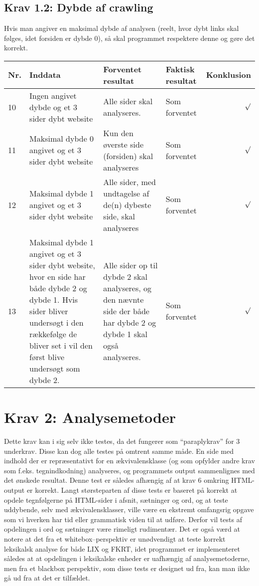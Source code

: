 \documentclass[a4paper,oneside,article]{memoir}
\begin{document}
\begin{landscape}
\subsection{Krav 1.2: Dybde af crawling}
Hvis man angiver en maksimal dybde af analysen (reelt, hvor dybt links
skal følges, idet forsiden er dybde 0), så skal programmet respektere
denne og gøre det korrekt.

\begin{longtable}[c]{p{20pt}|p{220pt}|p{130pt}|p{130pt}|r}
\textbf{Nr.} &
\textbf{Inddata} &
\textbf{Forventet resultat} &
\textbf{Faktisk resultat} &
\textbf{Konklusion} \\ \hline

10 &
Ingen angivet dybde og et 3 sider dybt website &
Alle sider skal analyseres. &
Som forventet &
$\surd$ \\ \hline

11 &
Maksimal dybde 0 angivet og et 3 sider dybt website &
Kun den øverste side (forsiden) skal analyseres &
Som forventet &
$\surd$ \\ \hline

12 &
Maksimal dybde 1 angivet og et 3 sider dybt website &
Alle sider, med undtagelse af de(n) dybeste side, skal analyseres &
Som forventet &
$\surd$ \\ \hline

13 &
Maksimal dybde 1 angivet og et 3 sider dybt website, hvor en side har
både dybde 2 og dybde 1. Hvis sider bliver undersøgt i den rækkefølge de
bliver set i vil den først blive undersøgt som dybde 2. &
Alle sider op til dybde 2 skal analyseres, og den nævnte side der både
har dybde 2 og dybde 1 skal også analyseres. &
Som forventet &
$\surd$ \\ \hline

\end{longtable}

\section{Krav 2: Analysemetoder}

Dette krav kan i sig selv ikke testes, da det fungerer som
``paraplykrav'' for 3 underkrav. Disse kan dog alle testes på omtrent
samme måde. En side med indhold der er repræsentativt for en
ækvivalensklasse (og som opfylder andre krav som
f.eks. tegnindkodning) analyseres, og programmets output sammenlignes
med det ønskede resultat. Denne test er således afhængig af at krav 6
omkring HTML-output er korrekt. Langt størsteparten af disse tests er
baseret på korrekt at opdele tegnfølgerne på HTML-sider i afsnit,
sætninger og ord, og at teste uddybende, selv med ækvivalensklasser,
ville være en ekstremt omfangsrig opgave som vi hverken har tid eller
grammatisk viden til at udføre. Derfor vil tests af opdelingen i ord
og sætninger være rimeligt rudimentær. Det er også værd at notere at
det fra et whitebox--perspektiv er unødvendigt at teste korrekt
leksikalsk analyse for både LIX og FKRT, idet programmet er
implementeret således at at opdelingen i leksikalske enheder er
uafhængig af analysemetoderne, men fra et blackbox perspektiv, som
disse tests er designet ud fra, kan man ikke gå ud fra at det er
tilfældet.


\end{landscape}
\end{document}
